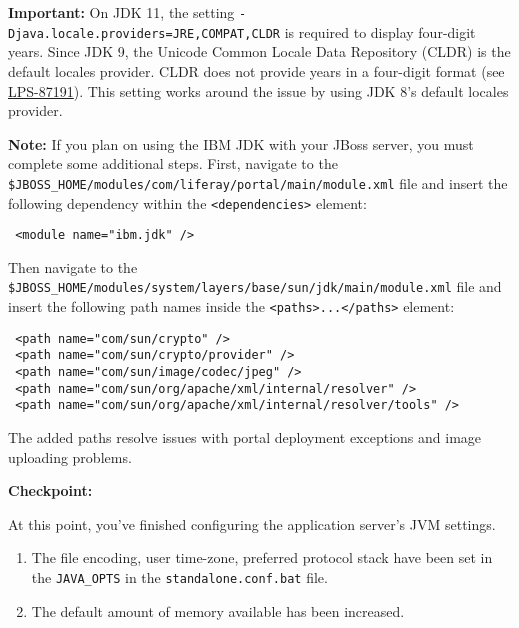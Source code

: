 \noindent\hrulefill

\textbf{Important:} On JDK 11, the setting
\texttt{-Djava.locale.providers=JRE,COMPAT,CLDR} is required to display
four-digit years. Since JDK 9, the Unicode Common Locale Data Repository
(CLDR) is the default locales provider. CLDR does not provide years in a
four-digit format (see
\href{https://issues.liferay.com/browse/LPS-87191}{LPS-87191}). This
setting works around the issue by using JDK 8's default locales
provider.

\noindent\hrulefill

\noindent\hrulefill

\textbf{Note:} If you plan on using the IBM JDK with your JBoss server,
you must complete some additional steps. First, navigate to the
\texttt{\$JBOSS\_HOME/modules/com/liferay/portal/main/module.xml} file
and insert the following dependency within the
\texttt{\textless{}dependencies\textgreater{}} element:

\begin{verbatim}
 <module name="ibm.jdk" />
\end{verbatim}

Then navigate to the
\texttt{\$JBOSS\_HOME/modules/system/layers/base/sun/jdk/main/module.xml}
file and insert the following path names inside the
\texttt{\textless{}paths\textgreater{}...\textless{}/paths\textgreater{}}
element:

\begin{verbatim}
 <path name="com/sun/crypto" />
 <path name="com/sun/crypto/provider" />
 <path name="com/sun/image/codec/jpeg" />
 <path name="com/sun/org/apache/xml/internal/resolver" />
 <path name="com/sun/org/apache/xml/internal/resolver/tools" />
\end{verbatim}

The added paths resolve issues with portal deployment exceptions and
image uploading problems.

\noindent\hrulefill

\textbf{Checkpoint:}

At this point, you've finished configuring the application server's JVM
settings.

\begin{enumerate}
\def\labelenumi{\arabic{enumi}.}
\item
  The file encoding, user time-zone, preferred protocol stack have been
  set in the \texttt{JAVA\_OPTS} in the \texttt{standalone.conf.bat}
  file.
\item
  The default amount of memory available has been increased.
\end{enumerate}

